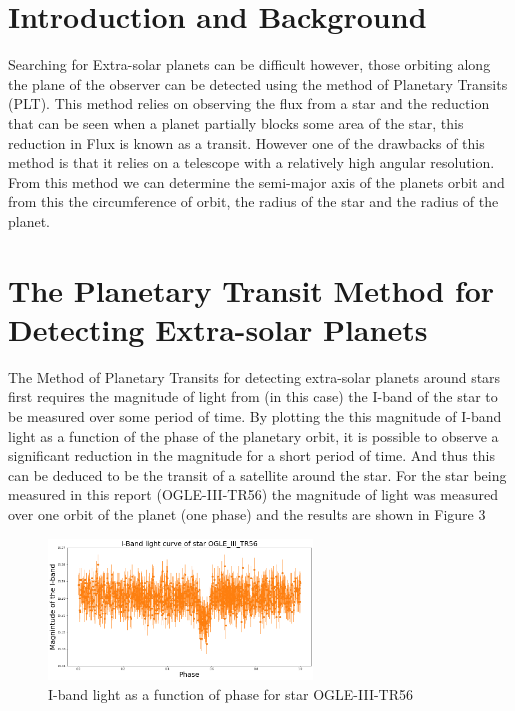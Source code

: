 \documentclass[]{article}
\begin{document}
\section*{Introduction and Background}
Searching for Extra-solar planets can be difficult however, 
those orbiting along the plane of the observer can be 
detected using the method of Planetary Transits (PLT).
This method relies on observing the flux from a star and the 
reduction that can be seen when a planet partially blocks some 
area of the star, this reduction in Flux is known as a transit.
However one of the drawbacks of this method is that it relies on 
a telescope with a relatively high angular resolution. 
From this method we can determine the semi-major axis of the planets
orbit and from this the circumference of orbit, the radius of the star
and the radius of the planet.
\par



\section*{The Planetary Transit Method for Detecting Extra-solar Planets}
The Method of Planetary Transits for detecting extra-solar planets
around stars first requires
the magnitude of light from (in this case) the I-band of 
the star to be measured over some period of time.
By plotting the this magnitude of I-band light as a 
function of the phase of the planetary orbit, it is 
possible to observe a significant reduction in the 
magnitude for a short period of time. And thus this can be 
deduced to be the transit of a satellite around the star.
For the star being measured in this report (OGLE-III-TR56)
the magnitude of light was measured over one orbit of the 
planet (one phase) and the results are shown in Figure 3

\begin{figure}[h]
  \includegraphics[width=7cm]{images/I-band_curve.png}
  \caption{I-band light as a function of phase for star OGLE-III-TR56}
  \label{fig:HD-_init}
  \end{figure}
\end{document}
